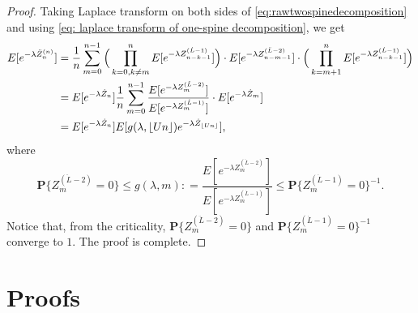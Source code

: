 \documentclass[12pt,a4paper]{amsart}
\DeclarePairedDelimiter\floor{\lfloor}{\rfloor}
\numberwithin{equation}{section}
\begin{document}
\begin{proof}
	Taking Laplace transform on both sides of \eqref{eq:rawtwospinedecomposition}  and using \eqref{eq: laplace transform of one-spine decomposition}, we get
\begin{equation} \label{eq:laplacetransformationoftwospinedecomposition} \begin{split}
	E [ e^{- \lambda \ddot Z_n^{(n)}} ]
	&= \frac{1}{n}\sum_{m=0}^{n-1} \Big( \prod_{k=0,k\neq m}^{n} E[e^{-\lambda Z^{(\dot L - 1)}_{n-k-1}}] \Big) \cdot E [e^{-\lambda Z^{(\ddot L - 2)}_{n-m-1}}] \cdot \Big(\prod_{k= m+1}^n E [e^{-\lambda Z^{(\dot L - 1)}_{n-k-1}}]\Big)
	\\&= E [e^{-\lambda \dot Z_n}]  \frac{1}{n}\sum_{m=0}^{n-1}   \frac{ E [e^{-\lambda Z^{(\ddot L - 2)}_{m}}] }{ E[e^{-\lambda Z^{(\dot L - 1)}_{m}}] } \cdot E[e^{- \lambda \dot Z_{m}}]
	\\&= E [e^{-\lambda \dot Z_n}] E[g(\lambda, \floor{Un})e^{-\lambda \dot Z_{\floor{Un}}}],
\end{split}
\end{equation}
	where 
\[
	\mathbf P\{Z^{(\ddot L - 2)}_m=0\}
	\leq	g(\lambda,m) 
	: = \frac{ E [e^{-\lambda Z^{(\ddot L - 2)}_{m}}] }{ E[e^{-\lambda Z^{(\dot L - 1)}_{m}}] }
	\leq \mathbf P\{Z^{(\dot L - 1)}_m = 0\}^{-1}.
\]
	Notice that, from the criticality, $\mathbf P\{Z^{(\ddot L - 2)}_m=0\}$ and $\mathbf P\{Z^{(\dot L - 1)}_m = 0\}^{-1}$ converge to $1$. 
	The proof is complete.
\end{proof}


\section{Proofs}
\label{sec: proofs}
\end{document}
